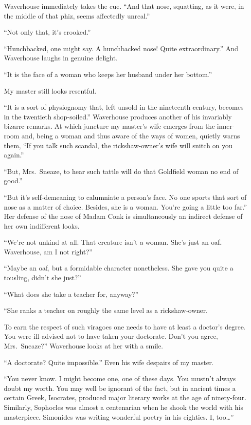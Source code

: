 \documentclass{book}
\begin{document}
Waverhouse immediately takes the cue. ``And that nose, squatting, as it
were, in the middle of that phiz, seems affectedly unreal.''

``Not only that, it's crooked.''

``Hunchbacked, one might say. A hunchbacked nose! Quite extraordinary.''
And Waverhouse laughs in genuine delight.

``It is the face of a woman who keeps her husband under her bottom.''

My master still looks resentful.

``It is a sort of physiognomy that, left unsold in the nineteenth
century, becomes in the twentieth shop-soiled.'' Waverhouse produces
another of his invariably bizarre remarks. At which juncture my master's
wife emerges from the inner-room and, being a woman and thus aware of
the ways of women, quietly warns them, ``If you talk such scandal, the
rickshaw-owner's wife will snitch on you again.''

``But, Mrs.~Sneaze, to hear such tattle will do that Goldfield woman no
end of good.''

``But it's self-demeaning to calumniate a person's face. No one sports
that sort of nose as a matter of choice. Besides, she is a woman. You're
going a little too far.'' Her defense of the nose of Madam Conk is
simultaneously an indirect defense of her own indifferent looks.

``We're not unkind at all. That creature isn't a woman. She's just an
oaf. Waverhouse, am I not right?''

``Maybe an oaf, but a formidable character nonetheless. She gave you
quite a tousling, didn't she just?''

``What does she take a teacher for, anyway?''

``She ranks a teacher on roughly the same level as a rickshaw-owner.

To earn the respect of such viragoes one needs to have at least a
doctor's degree. You were ill-advised not to have taken your doctorate.
Don't you agree, Mrs.~Sneaze?'' Waverhouse looks at her with a smile.

``A doctorate? Quite impossible.'' Even his wife despairs of my master.

``You never know. I might become one, one of these days. You mustn't
always doubt my worth. You may well be ignorant of the fact, but in
ancient times a certain Greek, Isocrates, produced major literary works
at the age of ninety-four. Similarly, Sophocles was almost a centenarian
when he shook the world with his masterpiece. Simonides was writing
wonderful poetry in his eighties. I, too\ldots{}''
\end{document}

